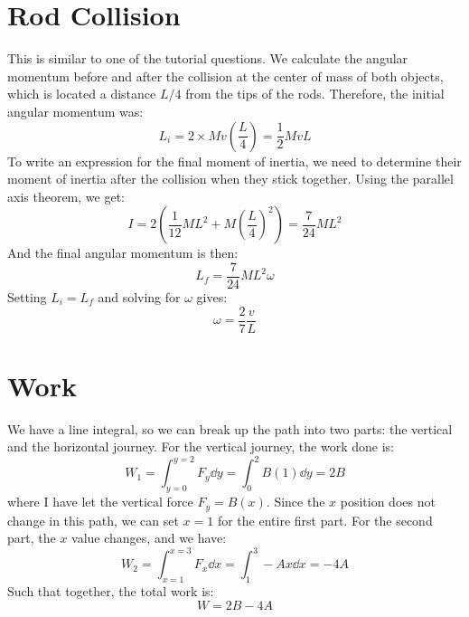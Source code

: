 \documentclass{article}
\begin{document}
\section{Rod Collision}
This is similar to one of the tutorial questions. We calculate the angular momentum before and after the collision at the center of mass of both objects, which is located a distance $L/4$ from the tips of the rods. Therefore, the initial angular momentum was:
\begin{equation}
    L_i = 2 \times Mv\left(\frac{L}{4}\right) = \frac{1}{2}MvL
    \label{eq:}
\end{equation}
To write an expression for the final moment of inertia, we need to determine their moment of inertia after the collision when they stick together. Using the parallel axis theorem, we get:
\begin{equation}
    I = 2\left(\frac{1}{12}ML^2+M\left(\frac{L}{4}\right)^2\right) = \frac{7}{24}ML^2
    \label{eq:}
\end{equation}
And the final angular momentum is then:
\begin{equation}
    L_f = \frac{7}{24}ML^2\omega
    \label{eq:}
\end{equation}
Setting $L_i=L_f$ and solving for $\omega$ gives:
\begin{equation}
    \boxed{\omega = \frac{2}{7} \frac{v}{L}}
    \label{eq:}
\end{equation}
\newpage
\section{Work}
We have a line integral, so we can break up the path into two parts: the vertical and the horizontal journey. For the vertical journey, the work done is:
\begin{equation}
    W_1 = \int_{y=0}^{y=2} F_y \dd{y} = \int_0^2 B(1) \dd{y} = 2B
    \label{eq:}
\end{equation}
where I have let the vertical force $F_y=B(x)$. Since the $x$ position does not change in this path, we can set $x=1$ for the entire first part. For the second part, the $x$ value changes, and we have:
\begin{equation}
    W_2 = \int_{x=1}^{x=3} F_x \dd{x} = \int_1^3 -Ax \dd{x} = -4A
    \label{eq:}
\end{equation}
Such that together, the total work is:
\begin{equation}
    \boxed{W = 2B-4A}
    \label{eq:}
\end{equation}
\end{document}
